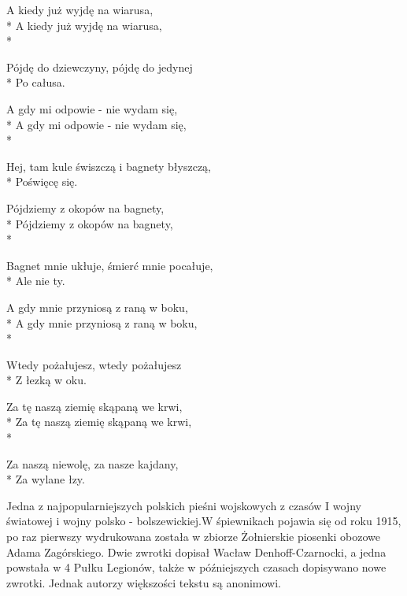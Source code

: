 \begin{lyrics}[longestline={Sto dwadzieścia kulek, sto dwadzieścia kulek}]
A kiedy już wyjdę na wiarusa,\\*
A kiedy już wyjdę na wiarusa,\\*
\begin{markverses}%
Pójdę do dziewczyny, pójdę do jedynej\\*
Po całusa.
\end{markverses}

A gdy mi odpowie - nie wydam się,\\*
A gdy mi odpowie - nie wydam się,\\*
\begin{markverses}%
Hej, tam kule świszczą i bagnety błyszczą,\\*
Poświęcę się.
\end{markverses}

Pójdziemy z okopów na bagnety,\\*
Pójdziemy z okopów na bagnety,\\*
\begin{markverses}%
Bagnet mnie ukłuje, śmierć mnie pocałuje,\\*
Ale nie ty.
\end{markverses}

A gdy mnie przyniosą z raną w boku,\\*
A gdy mnie przyniosą z raną w boku,\\*
\begin{markverses}%
Wtedy pożałujesz, wtedy pożałujesz\\*
Z łezką w oku.
\end{markverses}

Za tę naszą ziemię skąpaną we krwi,\\*
Za tę naszą ziemię skąpaną we krwi,\\*
\begin{markverses}%
Za naszą niewolę, za nasze kajdany,\\*
Za wylane łzy.
\end{markverses}
\end{lyrics}



\begin{info}Jedna z najpopularniejszych polskich pieśni wojskowych z czasów I wojny światowej i wojny polsko - bolszewickiej.W śpiewnikach pojawia się od roku 1915, po raz pierwszy wydrukowana została w zbiorze Żołnierskie piosenki obozowe Adama Zagórskiego. Dwie zwrotki dopisał Wacław Denhoff-Czarnocki, a jedna powstała w 4 Pułku Legionów, także w późniejszych czasach dopisywano nowe zwrotki. Jednak autorzy większości tekstu są anonimowi.\end{info}

